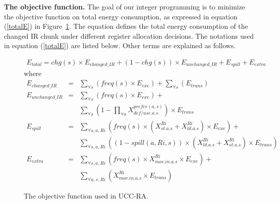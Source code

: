 \textbf{The objective function.}
The goal of our integer programming is to minimize the objective
function on total energy consumption, as expressed in equation (\ref{totalE}) in
Figure~\ref{feqn}. The equation defines the total energy consumption of the
changed IR chunk under different register allocation decisions. The notations
used in equation ({\ref{totalE}}) are listed below.
Other terms are explained as follows.
\vspace{-0.1in}
\begin{figure}[htbp]
\begin{small}
\begin{eqnarray}
E_{total} = 
chg(s) \times E_{changed\_IR} + (1-chg(s))\times E_{unchanged\_IR} +
E_{spill} + E_{extra}  \label{totalE}
\end{eqnarray}
where
\vspace{-0.3in}
\begin{eqnarray}
E_{changed\_IR} &= &\sum_{\forall s} (freq(s) \times E_{exe}) +
\sum_{\forall s}(E_{trans})  \label{cE}\\
%
E_{unchanged\_IR} &= & \sum_{\forall s} (freq(s) \times E_{exe}) + \nonumber\\ 
									&  & \sum_{\forall s}(1-\prod_{\forall 
a}{X_{def/use.a.s}^{prefer(a,s)}}) \times 					E_{trans} \label{uE}\\
%
E_{spill} &=& \sum_{\forall s, a, Ri}
(freq(s) \times (X_{st.a.s}^{Ri}+X_{ld.a.s}^{Ri}) \times E_{exe}) + \nonumber\\
					& & \sum_{\forall s, a, Ri}( (1-spill(a,Ri,s)) \times
 (X_{ld.a.s}^{Ri}+X_{st.a.s}^{Ri}) \times E_{trans})  \\
E_{extra} &=& \sum_{\forall s, a, Ri}
(freq(s) \times X_{mov.in.a.s}^{Ri} \times E_{exe}) + \nonumber\\
					& &\sum_{\forall a, s, Ri} (X_{mov.in.a.s}^{Ri} \times E_{trans}) 
\end{eqnarray}
\end{small}
\vspace{-0.5in}
\caption{The objective function used in UCC-RA.}
\label{feqn}
\end{figure}


